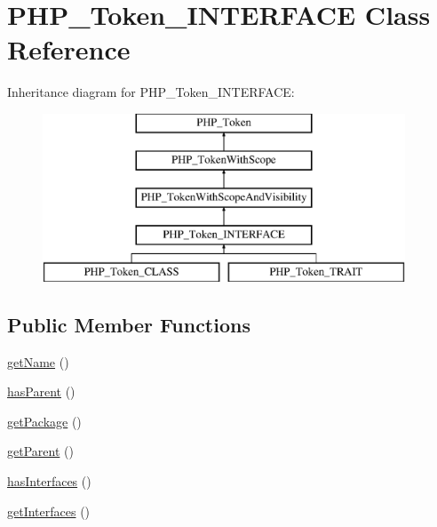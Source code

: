\hypertarget{class_p_h_p___token___i_n_t_e_r_f_a_c_e}{}\section{P\+H\+P\+\_\+\+Token\+\_\+\+I\+N\+T\+E\+R\+F\+A\+CE Class Reference}
\label{class_p_h_p___token___i_n_t_e_r_f_a_c_e}
Inheritance diagram for P\+H\+P\+\_\+\+Token\+\_\+\+I\+N\+T\+E\+R\+F\+A\+CE\+:\begin{figure}[H]
\begin{center}
\leavevmode
\includegraphics[height=5.000000cm]{class_p_h_p___token___i_n_t_e_r_f_a_c_e}
\end{center}
\end{figure}
\subsection*{Public Member Functions}
\begin{DoxyCompactItemize}
\item 
\mbox{\hyperlink{class_p_h_p___token___i_n_t_e_r_f_a_c_e_a3d0963e68bb313b163a73f2803c64600}{get\+Name}} ()
\item 
\mbox{\hyperlink{class_p_h_p___token___i_n_t_e_r_f_a_c_e_af777a5920aced0a4e1678d9ab65f35f7}{has\+Parent}} ()
\item 
\mbox{\hyperlink{class_p_h_p___token___i_n_t_e_r_f_a_c_e_a003e9642678de5840fb9049636a03829}{get\+Package}} ()
\item 
\mbox{\hyperlink{class_p_h_p___token___i_n_t_e_r_f_a_c_e_a95ecaee3537b1ad29b04ef383a57bbae}{get\+Parent}} ()
\item 
\mbox{\hyperlink{class_p_h_p___token___i_n_t_e_r_f_a_c_e_ad8a516c9d1294cf166daa14598b1f299}{has\+Interfaces}} ()
\item 
\mbox{\hyperlink{class_p_h_p___token___i_n_t_e_r_f_a_c_e_aacd41ad982fee4953d8ad245ab7e4ec9}{get\+Interfaces}} ()
\end{DoxyCompactItemize}
